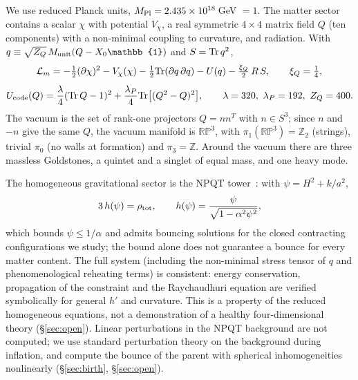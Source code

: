 \documentclass[11pt,a4paper]{article}
\newcommand{\RP}{\mathbb{RP}^3}
\newcommand{\Ztwo}{\mathbb{Z}_2}
\newcommand{\Mpl}{M_{\rm Pl}}
\begin{document}
We use reduced Planck units, $\Mpl = 2.435\times10^{18}$\,GeV $=1$.
The matter sector contains a scalar $\chi$ with potential $V_\chi$, a real symmetric $4\times4$ matrix field $Q$ (ten components) with a non-minimal coupling to curvature, and radiation.
With $q \equiv \sqrt{Z_Q}\,M_{\rm unit}(Q - X_0\mathbb{1})$ and $S = {\rm Tr}\,q^2$,
\begin{equation}
\mathcal{L}_m = -\tfrac12(\partial\chi)^2 - V_\chi(\chi) - \tfrac12{\rm Tr}(\partial q\,\partial q) - U(q) - \tfrac{\xi_Q}{2}\,R\,S,\qquad \xi_Q = \tfrac14,
\end{equation}
\begin{equation}
U_{\rm code}(Q) = \frac{\lambda}{4}({\rm Tr}\,Q - 1)^2 + \frac{\lambda_P}{4}{\rm Tr}\big[(Q^2-Q)^2\big],\qquad \lambda=320,\ \lambda_P=192,\ Z_Q = 400 .
\end{equation}
The vacuum is the set of rank-one projectors $Q = nn^{T}$ with $n\in S^3$; since $n$ and $-n$ give the same $Q$, the vacuum manifold is $\RP$, with $\pi_1(\RP)=\Ztwo$ (strings), trivial $\pi_0$ (no walls at formation) and $\pi_3=\mathbb{Z}$.
Around the vacuum there are three massless Goldstones, a quintet and a singlet of equal mass, and one heavy mode.

The homogeneous gravitational sector is the NPQT tower~\cite{Bueno2025formation}: with $\psi = H^2 + k/a^2$,
\begin{equation}
3\,h(\psi) = \rho_{\rm tot},\qquad h(\psi) = \frac{\psi}{\sqrt{1-\alpha^2\psi^2}},
\label{eq:friedmann}
\end{equation}
which bounds $\psi \le 1/\alpha$ and admits bouncing solutions for the closed contracting configurations we study; the bound alone does not guarantee a bounce for every matter content.
The full system (including the non-minimal stress tensor of $q$ and phenomenological reheating terms) is consistent: energy conservation, propagation of the constraint and the Raychaudhuri equation are verified symbolically for general $h'$ and curvature. This is a property of the reduced homogeneous equations, not a demonstration of a healthy four-dimensional theory (\S\ref{sec:open}).
Linear perturbations in the NPQT background are not computed; we use standard perturbation theory on the background during inflation, and compute the bounce of the parent with spherical inhomogeneities nonlinearly (\S\ref{sec:birth}, \S\ref{sec:open}).
\end{document}
